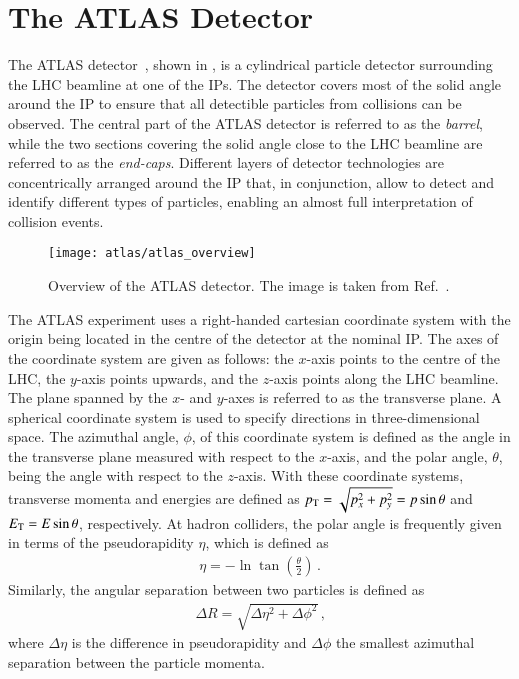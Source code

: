\section{The ATLAS Detector}%
\label{sec:atlas}

The ATLAS detector~\cite{PERF-2007-01}, shown in
, is a cylindrical particle detector
surrounding the LHC beamline at one of the IPs. The detector covers most of the
solid angle around the IP to ensure that all detectible particles from
collisions can be observed. The central part of the ATLAS detector is referred
to as the \emph{barrel}, while the two sections covering the solid angle close
to the LHC beamline are referred to as the \emph{end-caps}. Different layers of
detector technologies are concentrically arranged around the IP that, in
conjunction, allow to detect and identify different types of particles, enabling
an almost full interpretation of collision events.

\begin{figure}[htbp]
  \centering

  \texttt{[image: atlas/atlas\_overview]}

  \caption{Overview of the ATLAS detector. The image is taken from
    Ref.~\cite{PERF-2007-01}.}%
  \label{fig:atlas_detector_overview}
\end{figure}

The ATLAS experiment uses a right-handed cartesian coordinate system with the
origin being located in the centre of the detector at the nominal IP. The axes
of the coordinate system are given as follows: the $x$-axis points to the centre
of the LHC, the $y$-axis points upwards, and the $z$-axis points along the LHC
beamline. The plane spanned by the $x$- and $y$-axes is referred to as the
transverse plane. A spherical coordinate system is used to specify directions in
three-dimensional space. The azimuthal angle, $\phi$, of this coordinate system
is defined as the angle in the transverse plane measured with respect to the
$x$-axis, and the polar angle, $\theta$, being the angle with respect to the
$z$-axis. With these coordinate systems, transverse momenta and energies are
defined as $p_{\text{T}} = \sqrt{p_x^2 + p_y^2} = p \sin\theta$ and $E_{\text{T}} = E \sin\theta$,
respectively. At hadron colliders, the polar angle is frequently given in terms
of the pseudorapidity $\eta$, which is defined as
\begin{align*}
  \eta = - \ln\tan\left( \frac{\theta}{2} \right) \,\text{.}
\end{align*}
Similarly, the angular separation between two particles is defined as
\begin{align*}
  \Delta R = \sqrt{\Delta \eta^2 + \Delta \phi^2} \,\text{,}
\end{align*}
where $\Delta \eta$ is the difference in pseudorapidity and $\Delta \phi$ the
smallest azimuthal separation between the particle momenta.

